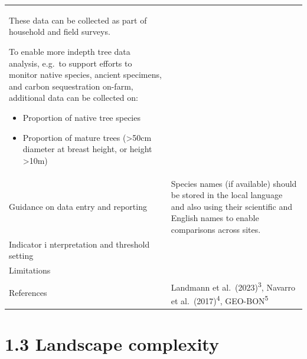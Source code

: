 \documentclass[
  letterpaper,
  DIV=11,
  numbers=noendperiod]{scrreprt}
\begin{document}
\begin{longtable}[]{@{}
  >{\raggedright\arraybackslash}p{}
  >{\raggedright\arraybackslash}p{}@{}}
\begin{minipage}[t]{\linewidth}
These data can be collected as part of household and field surveys.

To enable more indepth tree data analysis, e.g.~to support efforts to
monitor native species, ancient specimens, and carbon sequestration
on-farm, additional data can be collected on:

\begin{itemize}
\item
  Proportion of native tree species
\item
  Proportion of mature trees (\textgreater50cm diameter at breast
  height, or height \textgreater10m)
\end{itemize}
\end{minipage} \\
Guidance on data entry and reporting & Species names (if available)
should be stored in the local language and also using their scientific
and English names to enable comparisons across sites. \\
Indicator i nterpretation and threshold setting & \\
Limitations & \\
References & Landmann et al.~(2023)\textsuperscript{3}, Navarro et
al.~(2017)\textsuperscript{4}, GEO-BON\textsuperscript{5} \\
\end{longtable}

\chapter{1.3 Landscape complexity}\label{landscape-complexity}
\end{document}
